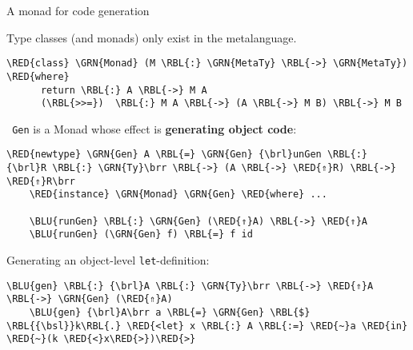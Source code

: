 \documentclass[dvipsnames,aspectratio=169]{beamer}
\newcommand{\ttt}[1]{{\texttt{#1}}}
\theoremstyle{remark}
\newcommand{\RED}[1]{{\color{BrickRed} #1}}
\newcommand{\GRN}[1]{{\color{OliveGreen} #1}}
\newcommand{\RBL}[1]{{\color{RoyalBlue} #1}}
\newcommand{\BLU}[1]{{\color{Blue} #1}}
\newcommand{\bsl}{\textbackslash}
\newcommand{\brl}{\textbraceleft}
\newcommand{\brr}{\textbraceright}
\begin{document}
\begin{frame}[fragile]{A monad for code generation}

Type classes (and monads) only exist in the metalanguage.
\begin{Verbatim}[commandchars=\\\{\}]
    \RED{class} \GRN{Monad} (M \RBL{:} \GRN{MetaTy} \RBL{->} \GRN{MetaTy}) \RED{where}
      return \RBL{:} A \RBL{->} M A
      (\RBL{>>=})  \RBL{:} M A \RBL{->} (A \RBL{->} M B) \RBL{->} M B
\end{Verbatim}
\pause
\vspace{0.5em}
\ttt{\GRN{Gen}} is a Monad whose effect is \textbf{generating object code}:
\vspace{0.5em}
\begin{Verbatim}[commandchars=\\\{\}]
    \RED{newtype} \GRN{Gen} A \RBL{=} \GRN{Gen} {\brl}unGen \RBL{:} {\brl}R \RBL{:} \GRN{Ty}\brr \RBL{->} (A \RBL{->} \RED{⇑}R) \RBL{->} \RED{⇑}R\brr
    \RED{instance} \GRN{Monad} \GRN{Gen} \RED{where} ...

    \BLU{runGen} \RBL{:} \GRN{Gen} (\RED{⇑}A) \RBL{->} \RED{⇑}A
    \BLU{runGen} (\GRN{Gen} f) \RBL{=} f id
\end{Verbatim}
\pause
\vspace{0.3em}
Generating an object-level \ttt{let}-definition:
\begin{Verbatim}[commandchars=\\\{\}]
    \BLU{gen} \RBL{:} {\brl}A \RBL{:} \GRN{Ty}\brr \RBL{->} \RED{⇑}A \RBL{->} \GRN{Gen} (\RED{⇑}A)
    \BLU{gen} {\brl}A\brr a \RBL{=} \GRN{Gen} \RBL{$} \RBL{{\bsl}}k\RBL{.} \RED{<let} x \RBL{:} A \RBL{:=} \RED{~}a \RED{in} \RED{~}(k \RED{<}x\RED{>})\RED{>}
\end{Verbatim}

\end{frame}
\end{document}
